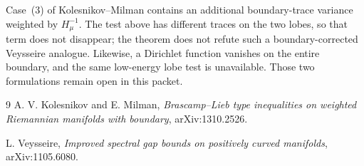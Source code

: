 \documentclass[11pt]{article}
\begin{document}
Case~(3) of Kolesnikov--Milman contains an additional boundary-trace variance
weighted by $H_\mu^{-1}$.  The test above has different traces on the two
lobes, so that term does not disappear; the theorem does not refute such a
boundary-corrected Veysseire analogue.  Likewise, a Dirichlet function
vanishes on the entire boundary, and the same low-energy lobe test is
unavailable.  Those two formulations remain open in this packet.

\begin{thebibliography}{9}
A. V. Kolesnikov and E. Milman,
\emph{Brascamp--Lieb type inequalities on weighted Riemannian manifolds with
boundary}, arXiv:1310.2526.

L. Veysseire,
\emph{Improved spectral gap bounds on positively curved manifolds},
arXiv:1105.6080.
\end{thebibliography}
\end{document}
